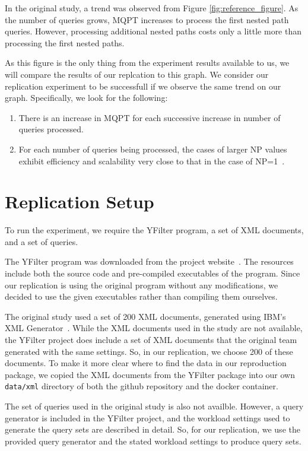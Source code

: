 \documentclass[sigconf, nonacm]{acmart}
\begin{document}
In the original study, a trend was observed from Figure \ref{fig:reference_figure}. As the number of queries grows, MQPT increases to process the first nested path queries. However, processing additional nested paths costs only a little more than processing the first nested paths.~\cite{yfilter}

As this figure is the only thing from the experiment results available to us, we will compare the results of our replcation to this graph. We consider our replication experiment to be successfull if we observe the same trend on our graph. Specifically, we look for the following:

\begin{enumerate}
    \item There is an increase in MQPT for each successive increase in number of queries processed.

    \item For each number of queries being processed, the cases of larger NP values exhibit efficiency and scalability very close to that in the case of NP=1~\cite{yfilter}.
\end{enumerate}


\section{Replication Setup}

To run the experiment, we require the YFilter program, a set of XML documents, and a set of queries. 

The YFilter program was downloaded from the project website~\cite{yfilter_source}. The resources include both the source code and pre-compiled executables of the program. Since our replication is using the original program without any modifications, we decided to use the given executables rather than compiling them ourselves.

The original study used a set of 200 XML documents, generated using IBM's XML Generator~\cite{IBM_XML}. While the XML documents used in the study are not available, the YFilter project does include a set of XML documents that the original team generated with the same settings. So, in our replication, we choose 200 of these documents. To make it more clear where to find the data in our reproduction package, we copied the XML documents from the YFilter package into our own \texttt{data/xml} directory of both the github repository and the docker container.

The set of queries used in the original study is also not availble. However, a query generator is included in the YFilter project, and the workload settings used to generate the query sets are described in detail. So, for our replication, we use the provided query generator and the stated workload settings to produce query sets.
\end{document}
